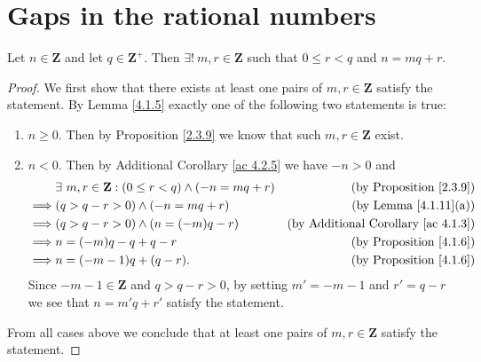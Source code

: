 \section{Gaps in the rational numbers}\label{sec 4.4}

\begin{additional corollary}\label{ac 4.4.1}
Let \(n \in \mathbf{Z}\) and let \(q \in \mathbf{Z}^+\).
Then \(\exists!\ m, r \in \mathbf{Z}\) such that \(0 \leq r < q\) and \(n = mq + r\).
\end{additional corollary}

\begin{proof}
    We first show that there exists at least one pairs of \(m, r \in \mathbf{Z}\) satisfy the statement.
    By Lemma \ref{4.1.5} exactly one of the following two statements is true:
    \begin{enumerate}
        \item \(n \geq 0\).
              Then by Proposition \ref{2.3.9} we know that such \(m, r \in \mathbf{Z}\) exist.
        \item \(n < 0\).
              Then by Additional Corollary \ref{ac 4.2.5} we have \(-n > 0\) and
              \begin{align*}
                           & \exists\ m, r \in \mathbf{Z} : (0 \leq r < q) \land (-n = mq + r) & \text{(by Proposition \ref{2.3.9})}             \\
                  \implies & (q > q - r > 0) \land (-n = mq + r)                               & \text{(by Lemma \ref{4.1.11}(a))}               \\
                  \implies & (q > q - r > 0) \land (n = (-m)q - r)                             & \text{(by Additional Corollary \ref{ac 4.1.3})} \\
                  \implies & n = (-m)q - q + q - r                                             & \text{(by Proposition \ref{4.1.6})}             \\
                  \implies & n = (-m - 1)q + (q - r).                                          & \text{(by Proposition \ref{4.1.6})}
              \end{align*}
              Since \(-m - 1 \in \mathbf{Z}\) and \(q > q - r > 0\), by setting \(m' = -m - 1\) and \(r' = q - r\) we see that \(n = m'q + r'\) satisfy the statement.
    \end{enumerate}
    From all cases above we conclude that at least one pairs of \(m, r \in \mathbf{Z}\) satisfy the statement.


\end{proof}
